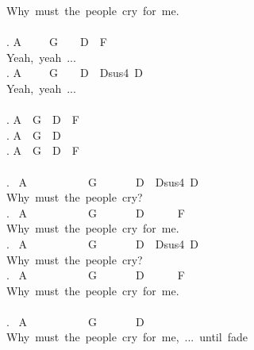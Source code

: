 {Why\ must\ the\ people\ cry\ for\ me.\\
\\
. A\ \ \ \ \ G\ \ \ \ D\ \ F\\
Yeah,\ yeah\ ...\\
. A\ \ \ \ \ G\ \ \ \ D\ \ Dsus4\ D\\
Yeah,\ yeah\ ...\\
\\
. A\ \ G\ \ D\ \ F\\
. A\ \ G\ \ D\\
. A\ \ G\ \ D\ \ F\\
\\
. \ A\ \ \ \ \ \ \ \ \ \ \ G\ \ \ \ \ \ \ D\ \ Dsus4\ D\\
Why\ must\ the\ people\ cry?\ \\
. \ A\ \ \ \ \ \ \ \ \ \ \ G\ \ \ \ \ \ \ D\ \ \ \ \ \ F\\
Why\ must\ the\ people\ cry\ for\ me.\\
. \ A\ \ \ \ \ \ \ \ \ \ \ G\ \ \ \ \ \ \ D\ \ Dsus4\ D\\
Why\ must\ the\ people\ cry?\ \\
. \ A\ \ \ \ \ \ \ \ \ \ \ G\ \ \ \ \ \ \ D\ \ \ \ \ \ F\ \ \\
Why\ must\ the\ people\ cry\ for\ me.\\
\\
. \ A\ \ \ \ \ \ \ \ \ \ \ G\ \ \ \ \ \ \ D\\
Why\ must\ the\ people\ cry\ for\ me,\ ...\ until\ fade}
